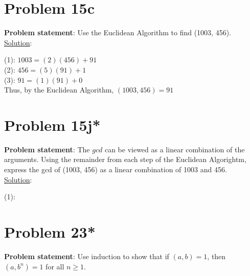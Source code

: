 \documentclass{article} %
\begin{document}
\newpage

\section*{Problem 15c}


\textbf{Problem statement}: Use the Euclidean Algorithm to find (1003, 456).
\\

\underline{Solution}: 
\begin{addmargin}[1em]{0em}
(1): $1003 = (2)(456) + 91$
\\(2): $456 = (5)(91) + 1$
\\(3): $91 = (1)(91) + 0$
\\Thus, by the Euclidean Algorithm, $(1003, 456) = 91$
\end{addmargin}

\newpage

\section*{Problem 15j*}


\textbf{Problem statement}: The $gcd$ can be viewed as a linear combination of the arguments.  Using the remainder from each step of the Euclidean Algorightm, express the gcd of (1003, 456) as a linear combination of 1003 and 456.
\\

\underline{Solution}: 
\begin{addmargin}[1em]{0em}
(1): $ $
\end{addmargin}

\newpage

\section*{Problem 23*}


\textbf{Problem statement}: Use induction to show that if $(a,b) = 1$, then $(a,b^n) = 1$ for all $n \geq 1$.
\\
\end{document}
